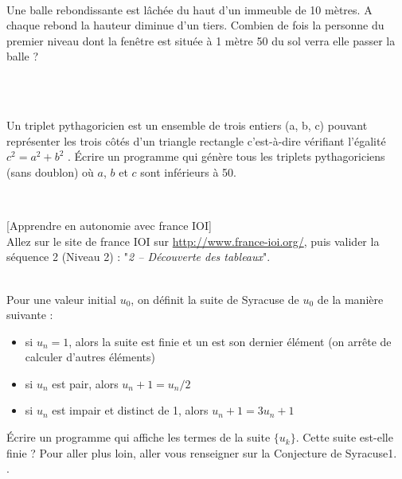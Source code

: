 \documentclass[a4paper,12pt]{article}
\begin{document}
\exo{}  ~\\ 
Une balle rebondissante est lâchée du haut d'un immeuble de 10 mètres. A chaque rebond la hauteur diminue d'un tiers. Combien de fois la personne du premier niveau dont la fenêtre est située à 1 mètre 50 du sol verra elle passer la balle ? 
\begin{correction}
	~\\ 
	
\end{correction}
\finexo


\exo{}  ~\\ 
Un triplet pythagoricien est un ensemble de trois entiers (a, b, c) pouvant représenter les trois côtés d’un triangle rectangle c’est-à-dire vérifiant l’égalité $c^2 = a^2 + b^2$ . Écrire un programme qui génère tous les triplets pythagoriciens (sans doublon) où $a$, $b$ et $c$ sont inférieurs à 50.
\begin{correction}
	~\\ 
		
\end{correction}
\finexo


\exo{}[Apprendre en  autonomie avec france IOI]  ~\\ 
Allez sur le site de france IOI sur \url{http://www.france-ioi.org/}, puis valider la séquence 2 (Niveau 2) :  "\textit{2 – Découverte des tableaux}".
\finexo

\exo{}  ~\\ 
Pour une valeur initial $u_0$, on définit la suite de Syracuse de $u_0$ de la manière suivante :
\begin{itemize}
	\item si $u_n = 1$, alors la suite est finie et un est son dernier élément (on arrête de calculer d’autres éléments)
	\item si $u_n$ est pair, alors $u_n+1  = u_n / 2$
	\item si $u_n$ est impair et distinct de 1, alors $u_n+1 = 3 u_n + 1$
\end{itemize}
Écrire un programme qui affiche les termes de la suite $\{u_k\}$.
Cette suite est-elle finie ?
Pour aller plus loin, aller vous renseigner sur la Conjecture de Syracuse1.\\

.
\begin{correction}
	~\\ 
	
\end{correction}
\end{document}
